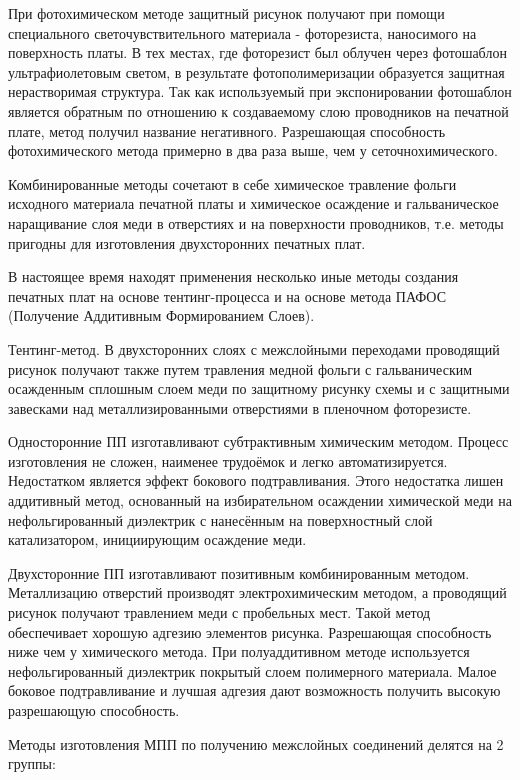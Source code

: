 \documentclass[unicode, 12pt, a4paper, oneside]{article}
\begin{document}
При фотохимическом методе защитный рисунок получают при помощи специального светочувствительного материала - фоторезиста, наносимого на поверхность платы. В тех местах, где фоторезист был облучен через фотошаблон ультрафиолетовым светом, в результате фотополимеризации образуется защитная нерастворимая структура. Так как используемый при экспонировании фотошаблон является обратным по отношению к создаваемому слою проводников на печатной плате, метод получил название негативного. Разрешающая способность фотохимического метода примерно в два  раза выше, чем у сеточнохимического.

Комбинированные методы сочетают в себе химическое травление фольги исходного материала печатной платы и химическое осаждение и гальваническое  наращивание слоя меди в отверстиях и на поверхности проводников, т.е. методы пригодны для изготовления двухсторонних печатных плат.

В настоящее время находят применения  несколько иные методы создания печатных плат на основе тентинг-процесса и на основе метода ПАФОС (Получение Аддитивным Формированием Слоев).

Тентинг-метод. В двухсторонних слоях с межслойными переходами проводящий рисунок получают также путем травления медной фольги с гальваническим осажденным сплошным слоем меди по защитному рисунку схемы и с защитными завесками над металлизированными отверстиями в пленочном фоторезисте.

Односторонние ПП изготавливают субтрактивным химическим методом. Процесс изготовления не сложен, наименее трудоёмок и легко автоматизируется. Недостатком является эффект бокового подтравливания. Этого недостатка лишен аддитивный метод, основанный на избирательном осаждении химической меди на нефольгированный диэлектрик с нанесённым на поверхностный слой катализатором, инициирующим осаждение меди.

Двухсторонние ПП изготавливают позитивным комбинированным методом. Металлизацию отверстий производят электрохимическим методом, а проводящий рисунок получают травлением меди с пробельных мест. Такой метод обеспечивает хорошую адгезию элементов рисунка. Разрешающая способность ниже чем у химического метода. При полуаддитивном методе используется нефольгированный диэлектрик покрытый слоем полимерного материала. Малое боковое подтравливание и лучшая адгезия дают возможность получить высокую разрешающую способность.

Методы изготовления МПП по получению межслойных соединений делятся на 2 группы:
\end{document}
